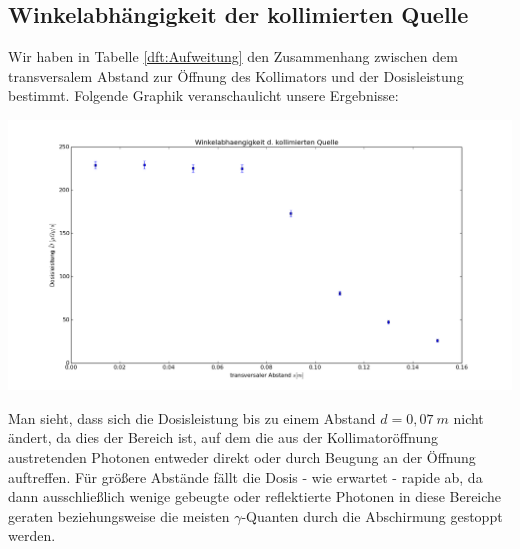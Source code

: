 \subsection{Winkelabhängigkeit der kollimierten Quelle}
Wir haben in Tabelle \ref{dft:Aufweitung} den Zusammenhang zwischen dem transversalem Abstand zur Öffnung des Kollimators und der Dosisleistung bestimmt. Folgende Graphik veranschaulicht unsere Ergebnisse:
\begin{center}
    \minipanf      
        	 \includegraphics[width=1.2\linewidth,
        	 height=0.4\textheight]{pic/winkelabhaengigkeit}
        \label{fig:Aufweitung}
    \minipend
    \vspace{5mm}
\end{center}
Man sieht, dass sich die Dosisleistung bis zu einem Abstand $d=0,07\ \unit{m}$ nicht ändert, da dies der Bereich ist, auf dem die aus der Kollimatoröffnung austretenden Photonen entweder direkt oder durch Beugung an der Öffnung auftreffen. Für größere Abstände fällt die Dosis - wie erwartet - rapide ab, da dann ausschließlich wenige gebeugte oder reflektierte Photonen in diese Bereiche geraten beziehungsweise die meisten $\gamma$-Quanten durch die Abschirmung gestoppt werden.


